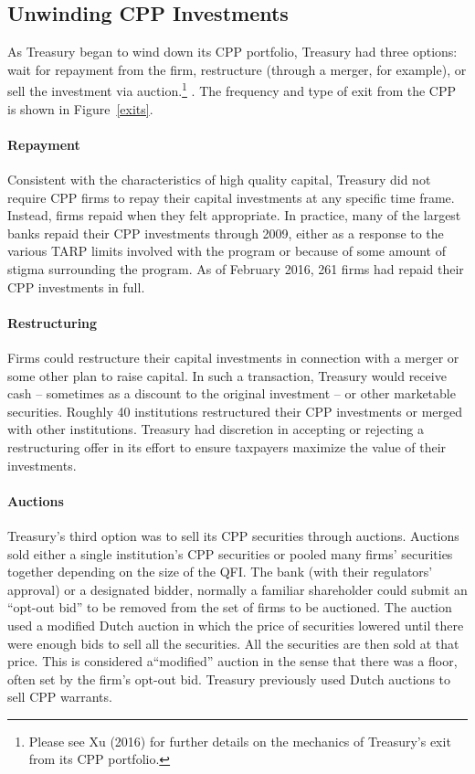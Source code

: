 \documentclass[12pt]{article}
\begin{document}
\subsection*{Unwinding CPP Investments}

As Treasury began to wind down its CPP portfolio, Treasury had three options: wait for repayment from the firm, restructure (through a merger, for example), or sell the investment via auction.\footnote{Please see Xu (2016) for further details on the mechanics of Treasury's exit from its CPP portfolio.} \citep{MassadExit}. The frequency and type of exit from the CPP is shown in Figure~\ref{exits}. 

\paragraph{Repayment}

Consistent with the characteristics of high quality capital, Treasury did not require CPP firms to repay their capital investments at any specific time frame. Instead, firms repaid when they felt appropriate. In practice, many of the largest banks repaid their CPP investments through 2009, either as a response to the various TARP limits involved with the program or because of some amount of stigma surrounding the program. As of February 2016, 261 firms had repaid their CPP investments in full.

\paragraph{Restructuring}

Firms could restructure their capital investments in connection with a merger or some other plan to raise capital. In such a transaction, Treasury would receive cash -- sometimes as a discount to the original investment -- or other marketable securities. Roughly 40 institutions restructured their CPP investments or merged with other institutions. Treasury had discretion in accepting or rejecting a restructuring offer in its effort to ensure taxpayers maximize the value of their investments.

\paragraph{Auctions}

Treasury's third option was to sell its CPP securities through auctions. Auctions sold either a single institution's CPP securities or pooled many firms' securities together depending on the size of the QFI. The bank (with their regulators' approval) or a designated bidder, normally a familiar shareholder could submit an ``opt-out bid'' to be removed from the set of firms to be auctioned. The auction used a modified Dutch auction in which the price of securities lowered until there were enough bids to sell all the securities. All the securities are then sold at that price. This is considered a``modified'' auction in the sense that there was a floor, often set by the firm's opt-out bid. Treasury previously used Dutch auctions to sell CPP warrants. 
\end{document}
